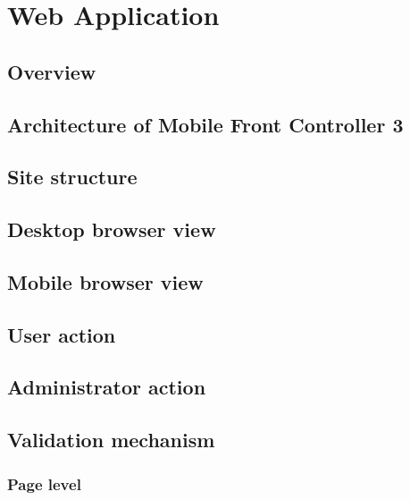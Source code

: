 
\chapter{Web Application}
\label{sec:WebApplication}

\section{Overview}
\label{sec:WebApplication:Overview}


\section{Architecture of Mobile Front Controller 3}
\label{sec:WebApplication:ArchitectureOfMobileFrontController3}

\section{Site structure}
\label{sec:WebApplication:SiteStructure}

\section{Desktop browser view}
\label{sec:WebApplication:DesktopBrowserView}

\section{Mobile browser view}
\label{sec:WebApplication:MobileBrowserView}

\section{User action}
\label{sec:WebApplication:UserAction}

\section{Administrator action}
\label{sec:WebApplication:AdministratorAction}

\section{Validation mechanism}
\label{sec:WebApplication:ValidationMechanism}

\subsection{Page level}
\label{sec:WebApplication:ValidationMechanism:PageLevel}

